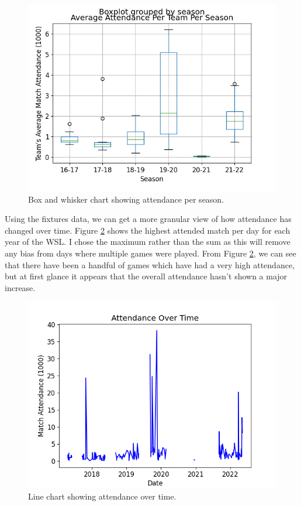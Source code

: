\documentclass[12pt, a4paper, twocolumn]{article}
\begin{document}
\begin{figure}
  \includegraphics[width=\linewidth]{../vis/tables/attendance_boxwhisker.png}
  \caption{Box and whisker chart showing attendance per season.}
  \label{att_box}
\end{figure}

Using the fixtures data, we can get a more granular view of how attendance has changed over time. Figure \ref{att_ot} shows the highest attended match per day for each year of the WSL. I chose the maximum rather than the sum as this will remove any bias from days where multiple games were played. From Figure \ref{att_ot}, we can see that there have been a handful of games which have had a very high attendance, but at first glance it appears that the overall attendance hasn't shown a major increase.

\begin{figure}
  \includegraphics[width=\linewidth]{../vis/fixtures/attendance_overtime.png}
  \caption{Line chart showing attendance over time.}
  \label{att_ot}
\end{figure}
\end{document}
